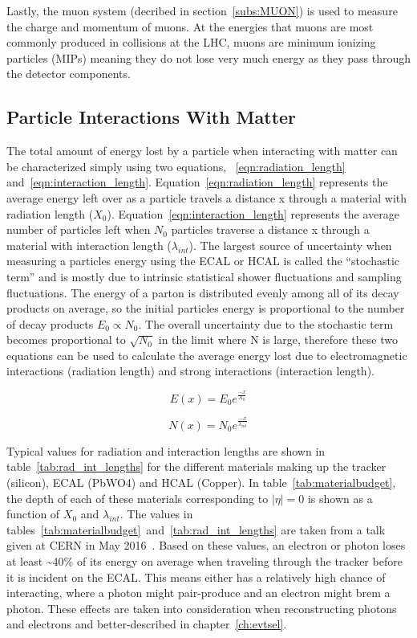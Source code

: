 Lastly, the muon system (decribed in section~\ref{subs:MUON}) is used to measure the charge and momentum of muons.
At the energies that muons are most commonly produced in collisions at the LHC, muons are minimum ionizing particles (MIPs)
meaning they do not lose very much energy as they pass through the detector components.

\subsection{Particle Interactions With Matter}

The total amount of energy lost by a particle when interacting with matter can be characterized simply using two equations,
~\ref{eqn:radiation_length} and~\ref{eqn:interaction_length}.
Equation~\ref{eqn:radiation_length} represents the average energy left over as a particle travels a distance x through a material with radiation length ($X_{0}$).
Equation~\ref{eqn:interaction_length} represents the average number of particles left when $N_{0}$ particles traverse a distance x through a material with interaction length ($\lambda_{int}$).
The largest source of uncertainty when measuring a particles energy using the ECAL or HCAL is called the ``stochastic term''
and is mostly due to intrinsic statistical shower fluctuations and sampling fluctuations.
The energy of a parton is distributed evenly among all of its decay products on average,
so the initial particles energy is proportional to the number of decay products $E_{0} \propto N_{0}$.
The overall uncertainty due to the stochastic term becomes proportional to $\sqrt{N_{0}}$ in the limit where N is large,
therefore these two equations can be used to calculate the average energy lost due to
electromagnetic interactions (radiation length) and strong interactions (interaction length).

\begin{equation}
  \label{eqn:radiation_length}
  E(x) = E_{0}e^{\frac{-x}{X_{0}}}  
\end{equation}

\begin{equation}
  \label{eqn:interaction_length}
  N(x) = N_{0}e^{\frac{-x}{\lambda_{int}}}  
\end{equation}

Typical values for radiation and interaction lengths are shown in table~\ref{tab:rad_int_lengths}
for the different materials making up the tracker (silicon), ECAL (PbWO4) and HCAL (Copper).
In table~\ref{tab:materialbudget}, the depth of each of these materials corresponding to $|\eta| = 0$ is shown as a function of $X_{0}$ and $\lambda_{int}$.
The values in tables~\ref{tab:materialbudget}~and~\ref{tab:rad_int_lengths} are taken from a talk given at CERN in May 2016~\cite{calorimetry}.
Based on these values, an electron or photon loses at least \textasciitilde{}40\%
of its energy on average when traveling through the tracker before it is incident on the ECAL.
This means either has a relatively high chance of interacting, where a photon might pair-produce and an electron might brem a photon.
These effects are taken into consideration when reconstructing photons and electrons and better-described in chapter~\ref{ch:evtsel}.

